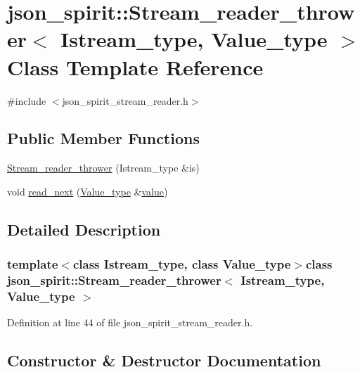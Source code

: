 \hypertarget{classjson__spirit_1_1_stream__reader__thrower}{}\section{json\+\_\+spirit\+:\+:Stream\+\_\+reader\+\_\+thrower$<$ Istream\+\_\+type, Value\+\_\+type $>$ Class Template Reference}
\label{classjson__spirit_1_1_stream__reader__thrower}


{\ttfamily \#include $<$json\+\_\+spirit\+\_\+stream\+\_\+reader.\+h$>$}

\subsection*{Public Member Functions}
\begin{DoxyCompactItemize}
\item 
\hyperlink{classjson__spirit_1_1_stream__reader__thrower_a702cfd4fc32e9ec5dd7009e8393b5f9b}{Stream\+\_\+reader\+\_\+thrower} (Istream\+\_\+type \&is)
\item 
void \hyperlink{classjson__spirit_1_1_stream__reader__thrower_a81a7d8e8705c328a9947d5ddccecc5f7}{read\+\_\+next} (\hyperlink{namespacejson__spirit_aeaad57c912e0370a76f60cd510ad3d74}{Value\+\_\+type} \&\hyperlink{cache_8cc_a0f61d63b009d0880a89c843bd50d8d76}{value})
\end{DoxyCompactItemize}


\subsection{Detailed Description}
\subsubsection*{template$<$class Istream\+\_\+type, class Value\+\_\+type$>$class json\+\_\+spirit\+::\+Stream\+\_\+reader\+\_\+thrower$<$ Istream\+\_\+type, Value\+\_\+type $>$}



Definition at line 44 of file json\+\_\+spirit\+\_\+stream\+\_\+reader.\+h.



\subsection{Constructor \& Destructor Documentation}
\hypertarget{classjson__spirit_1_1_stream__reader__thrower_a702cfd4fc32e9ec5dd7009e8393b5f9b}{}
